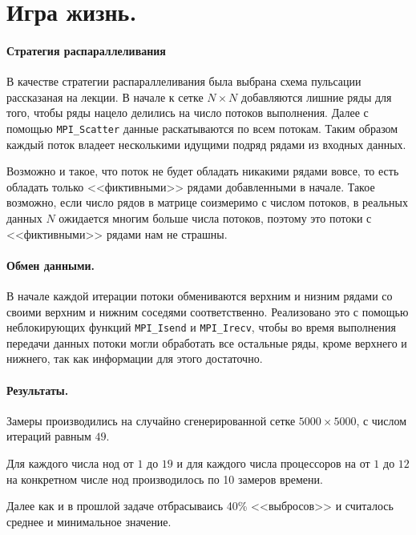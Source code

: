 \documentclass[12pt]{article}
\begin{document}
\section{Игра жизнь.}
\paragraph{Стратегия распараллеливания}
В качестве стратегии распараллеливания была выбрана схема пульсации рассказаная
на лекции. В начале к сетке $ N \times  N $ добавляются лишние ряды для того,
чтобы ряды нацело делились на число потоков выполнения. Далее с помощью
\verb|MPI_Scatter| данные раскатываются по всем потокам. Таким образом
каждый поток владеет несколькими идущими подряд рядами из входных данных.

Возможно и такое, что поток не будет обладать никакими рядами вовсе, то есть
обладать только <<фиктивными>> рядами добавленными в начале. Такое возможно,
если число рядов в матрице соизмеримо с числом потоков, в реальных данных $ N $ 
ожидается многим больше числа потоков, поэтому это потоки с <<фиктивными>> рядами
нам не страшны.

\paragraph{Обмен данными.}
В начале каждой итерации потоки обмениваются верхним и низним рядами со своими
верхним и нижним соседями соответственно. Реализовано это с помощью неблокирующих
функций \verb|MPI_Isend| и \verb|MPI_Irecv|, чтобы во время выполнения передачи
данных потоки могли обработать все остальные ряды, кроме верхнего и нижнего, так
как информации для этого достаточно.

\paragraph{Результаты.}
Замеры производились на случайно сгенерированной сетке $ 5000 \times 5000 $, с
числом итераций равным $ 49 $.

Для каждого числа нод от $ 1 $ до $ 19 $ и для каждого числа процессоров на
от $ 1 $ до $ 12 $ на конкретном числе нод производилось по 10 замеров времени.

Далее как и в прошлой задаче отбрасываись 40\% <<выбросов>> и считалось среднее
и минимальное значение.
\end{document}
